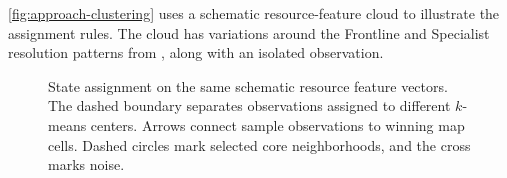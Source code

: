 \autoref{fig:approach-clustering} uses a schematic resource-feature cloud to illustrate the assignment rules. The cloud has variations around the Frontline and Specialist resolution patterns from , along with an isolated observation.

\begin{figure}[!t]
  \centering
  
  \caption{State assignment on the same schematic resource feature vectors. The dashed boundary separates observations assigned to different $k$-means centers. Arrows connect sample observations to winning map cells. Dashed circles mark selected core neighborhoods, and the cross marks noise.}
  \label{fig:approach-clustering}
\end{figure}
